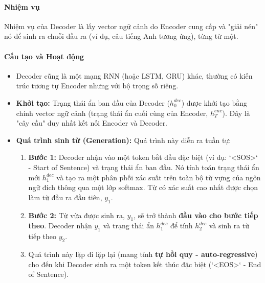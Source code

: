 \paragraph{Nhiệm vụ}
Nhiệm vụ của Decoder là lấy vector ngữ cảnh do Encoder cung cấp và "giải nén" nó để sinh ra chuỗi đầu ra (ví dụ, câu tiếng Anh tương ứng), từng từ một.

\paragraph{Cấu tạo và Hoạt động}
\begin{itemize}
    \item Decoder cũng là một mạng RNN (hoặc LSTM, GRU) khác, thường có kiến trúc tương tự Encoder nhưng với bộ trọng số riêng.
    \item \textbf{Khởi tạo:} Trạng thái ẩn ban đầu của Decoder ($h_0^{dec}$) được khởi tạo bằng chính vector ngữ cảnh (trạng thái ẩn cuối cùng của Encoder, $h_T^{enc}$). Đây là "cây cầu" duy nhất kết nối Encoder và Decoder.
    \item \textbf{Quá trình sinh từ (Generation):} Quá trình này diễn ra tuần tự:
        \begin{enumerate}
            \item \textbf{Bước 1:} Decoder nhận vào một token bắt đầu đặc biệt (ví dụ: `<SOS>` - Start of Sentence) và trạng thái ẩn ban đầu. Nó tính toán trạng thái ẩn mới $h_1^{dec}$ và tạo ra một phân phối xác suất trên toàn bộ từ vựng của ngôn ngữ đích thông qua một lớp softmax. Từ có xác suất cao nhất được chọn làm từ đầu ra đầu tiên, $y_1$.
            \item \textbf{Bước 2:} Từ vừa được sinh ra, $y_1$, sẽ trở thành \textbf{đầu vào cho bước tiếp theo}. Decoder nhận $y_1$ và trạng thái ẩn $h_1^{dec}$ để tính $h_2^{dec}$ và sinh ra từ tiếp theo $y_2$.
            \item Quá trình này lặp đi lặp lại (mang tính \textbf{tự hồi quy - auto-regressive}) cho đến khi Decoder sinh ra một token kết thúc đặc biệt (`<EOS>` - End of Sentence).
        \end{enumerate}
\end{itemize}

